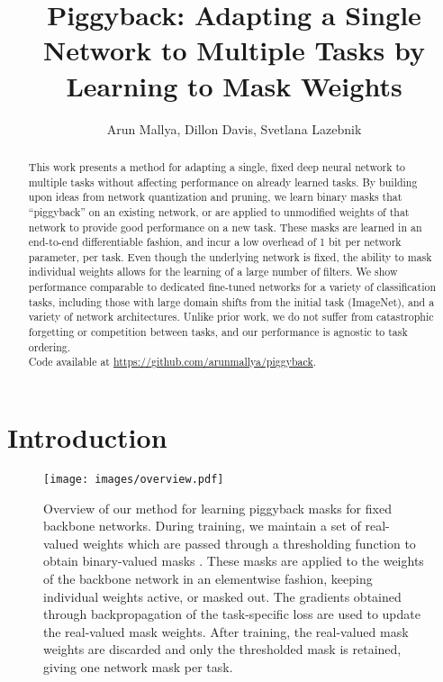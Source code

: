 \documentclass{llncs}
\begin{document}
\pagestyle{headings}
\mainmatter

\title{Piggyback: Adapting a Single Network to Multiple Tasks by Learning to Mask Weights}
\author{Arun Mallya, Dillon Davis, Svetlana Lazebnik}
\maketitle




\begin{abstract}
This work presents a method for adapting a single, fixed deep neural network to multiple tasks without affecting performance on already learned tasks. 
By building upon ideas from network quantization and pruning, we learn binary masks that ``piggyback'' on an existing network, or are applied to unmodified weights of that network to provide good performance on a new task. 
These masks are learned in an end-to-end differentiable fashion, and incur a low overhead of 1 bit per network parameter, per task. 
Even though the underlying network is fixed, the ability to mask individual weights allows for the learning of a large number of filters. 
We show performance comparable to dedicated fine-tuned networks for a variety of classification tasks, including those with large domain shifts from the initial task (ImageNet), and a variety of network architectures. 
Unlike prior work, we do not suffer from catastrophic forgetting or competition between tasks, and our performance is agnostic to task ordering. \\
Code available at \url{https://github.com/arunmallya/piggyback}.

\end{abstract}
 

\section{Introduction}
\label{sec:introduction}

\begin{figure*}[t]
\centering
\texttt{[image: images/overview.pdf]}
\caption{Overview of our method for learning piggyback masks for fixed backbone networks. During training, we maintain a set of real-valued weights  which are passed through a thresholding function to obtain binary-valued masks . These masks are applied to the weights  of the backbone network in an elementwise fashion, keeping individual weights active, or masked out. The gradients obtained through backpropagation of the task-specific loss are used to update the real-valued mask weights. After training, the real-valued mask weights are discarded and only the thresholded mask is retained, giving one network mask per task. 
}
\label{fig:overview}
\end{figure*}
\end{document}
